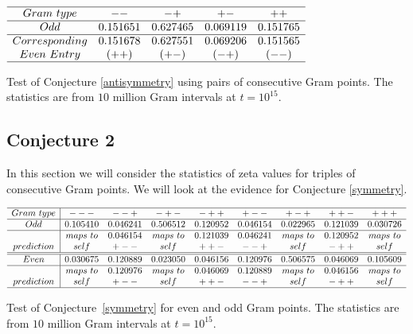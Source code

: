 \documentclass[twoside]{article}
\begin{document}
\begin{table}
\centering \(\begin{array}{ccccc}
\hline
 Gram~type&   --   & -+   & +-   & ++  \\
\hline
Odd & 0.151651&0.627465&0.069119&0.151765\\
\hline
Corresponding& 0.151678 & 0.627551 & 0.069206& 0.151565\\ 
Even~Entry     & (++)     & (+-)   & (-+)  & (--) \\
\hline
\end{array}\)
\caption{Test of Conjecture \ref{antisymmetry} using pairs of consecutive Gram points.  The statistics are from $10$ million Gram intervals at $t=10^{15}$.} \label{tab:pairtest}
\end{table}


\subsection{\label{sec4b}Conjecture 2}
In this section we will consider the statistics of zeta values for triples of consecutive Gram points. We will look at the evidence for  Conjecture \ref{symmetry}.

\begin{table}
\centering \(\begin{array}{c|cccccccc}
\hline
 Gram~type&   ---        & --+       & -+-          & -++          &   +--           & +-+   & ++-   & +++ \\
\hline
Odd & 0.105410&0.046241&0.506512&0.120952&0.046154&0.022965&0.121039&0.030726 \\
\hline
 &maps~to& 0.046154& maps~to& 0.121039& 0.046241& maps~to& 0.120952& maps~to\\
prediction   &  self         & +--       &  self        & ++-       & --+       & self        & -++      & self  \\
\hline
\hline
Even & 0.030675&0.120889&0.023050&0.046156&0.120976&0.506575&0.046069&0.105609 \\
\hline
 &maps~to& 0.120976& maps~to& 0.046069& 0.120889& maps~to& 0.046156& maps~to\\ 
prediction   &  self         & +--       &  self        & ++-       & --+       & self        & -++      & self  \\
\hline
\end{array}\)
\caption{Test of Conjecture~\ref{symmetry} for  even and odd Gram points.  The statistics are from $10$ million Gram intervals at $t=10^{15}$.} \label{tab:tripletestcomplexity}
\end{table}
\end{document}
